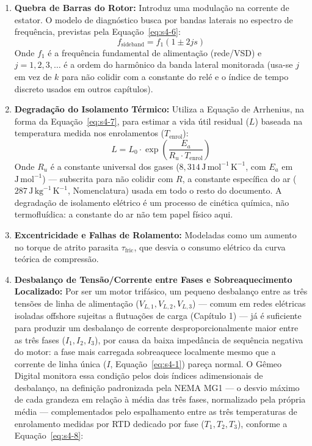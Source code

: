\documentclass[12pt,a4paper]{article}
\numberwithin{equation}{section}
\numberwithin{table}{section}
\numberwithin{figure}{section}
\begin{document}
	\begin{enumerate}
		\item \textbf{Quebra de Barras do Rotor:} Introduz uma modulação na corrente de estator. O modelo de diagnóstico busca por bandas laterais no espectro de frequência, previstas pela Equação~\eqref{eq:s4-6}:
		\begin{equation}\label{eq:s4-6}
 f_{\text{sideband}} = f_1 (1 \pm 2js) 
\end{equation}
		Onde $f_1$ é a frequência fundamental de alimentação (rede/VSD) e $j = 1, 2, 3, \dots$ é a ordem do harmônico da banda lateral monitorada (usa-se $j$ em vez de $k$ para não colidir com a constante do relé e o índice de tempo discreto usados em outros capítulos).
		\item \textbf{Degradação do Isolamento Térmico:} Utiliza a Equação de Arrhenius, na forma da Equação~\eqref{eq:s4-7}, para estimar a vida útil residual ($L$) baseada na temperatura medida nos enrolamentos ($T_{\text{enrol}}$):
		\begin{equation}\label{eq:s4-7}
 L = L_0 \cdot \exp \left( \frac{E_a}{R_u \cdot T_{\text{enrol}}} \right)
\end{equation}
		Onde $R_u$ é a constante universal dos gases ($8{,}314\,\text{J}\,\text{mol}^{-1}\,\text{K}^{-1}$, com $E_a$ em $\text{J}\,\text{mol}^{-1}$) — subscrita para não colidir com $R$, a constante específica do ar ($287\,\text{J}\,\text{kg}^{-1}\,\text{K}^{-1}$, Nomenclatura) usada em todo o resto do documento. A degradação de isolamento elétrico é um processo de cinética química, não termofluídica: a constante do ar não tem papel físico aqui.
		\item \textbf{Excentricidade e Falhas de Rolamento:} Modeladas como um aumento no torque de atrito parasita $\tau_{\text{fric}}$, que desvia o consumo elétrico da curva teórica de compressão.
		\item \textbf{Desbalanço de Tensão/Corrente entre Fases e Sobreaquecimento Localizado:} Por ser um motor trifásico, um pequeno desbalanço entre as três tensões de linha de alimentação ($V_{L,1}, V_{L,2}, V_{L,3}$) — comum em redes elétricas isoladas offshore sujeitas a flutuações de carga (Capítulo 1) — já é suficiente para produzir um desbalanço de corrente desproporcionalmente maior entre as três fases ($I_1, I_2, I_3$), por causa da baixa impedância de sequência negativa do motor: a fase mais carregada sobreaquece localmente mesmo que a corrente de linha única ($I$, Equação~\eqref{eq:s4-1}) pareça normal. O Gêmeo Digital monitora essa condição pelos dois índices adimensionais de desbalanço, na definição padronizada pela NEMA MG1 \cite{nemamg1} — o desvio máximo de cada grandeza em relação à média das três fases, normalizado pela própria média — complementados pelo espalhamento entre as três temperaturas de enrolamento medidas por RTD dedicado por fase ($T_1, T_2, T_3$), conforme a Equação~\eqref{eq:s4-8}:

\end{enumerate}
\end{document}
